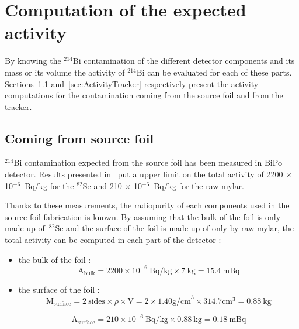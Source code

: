 \documentclass[main.tex]{subfiles}
\begin{document}
\clearpage
\newpage


\section{Computation of the expected activity}\label{sec:ActivityComputation}


\NI By knowing the $^{\text{214}}$Bi contamination of the different detector components and its mass or its volume the activity of $^{\text{214}}$Bi can be evaluated for each of these parts. Sections~\ref{sec:ActivitySourceFoil} and~\ref{sec:ActivityTracker} respectively present the activity computations for the contamination coming from the source foil and from the tracker.  


\subsection{Coming from source foil}\label{sec:ActivitySourceFoil}


\noindent $^{\text{214}}$Bi contamination expected from the source foil has been measured in BiPo detector. Results presented in~\cite{BiPoResultsGomez,BiPoResultsLoaiza} put a upper limit on the total activity of 2200 $\times$ 10$^{-\text{6}}$~Bq/kg for the $^{\text{82}}$Se and 210 $\times$ 10$^{-\text{6}}$~Bq/kg for the raw mylar.  


\bigskip


\noindent Thanks to these measurements, the radiopurity of each components used in the source foil fabrication is known. By assuming that the bulk of the foil is only made up of~$^{82}$Se and the surface of the foil is made up of only by raw mylar, the total activity can be computed in each part of the detector : 

\begin{itemize}
\item the bulk of the foil :
\begin{equation}
\text{A}_{\text{bulk}} =  \text{2200} \times \text{10}^{-\text{6}}~ \text{Bq/kg} \times \text{7}~\text{kg} = \text{15.4}~\text{mBq} 
\end{equation}

\item the surface of the foil :
\begin{equation}
\text{M}_{\text{surface}} = \text{2}~\text{sides} \times \rho \times \text{V} = \text{2} \times \text{1.40} \text{g/cm}^\text{3} \times \text{314.7} \text{cm}^\text{3} = \text{0.88}~\text{kg}
\end{equation}

\begin{equation}
\text{A}_{\text{surface}} = \text{210} \times \text{10}^{-\text{6}}~\text{Bq/kg} \times \text{0.88}~\text{kg} = \text{0.18}~\text{mBq} 
\end{equation}
\end{itemize}
\end{document}
